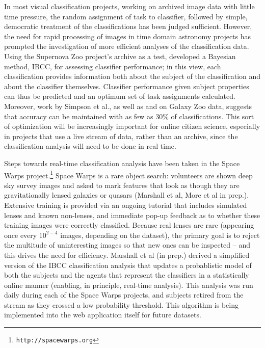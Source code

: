 \documentclass{ar2e}
\def\CaseStudy#1{\noindent{\it\bf #1 \,\,\,\,}}
\def\url#1{\texttt{#1}}
\begin{document}
In most visual classification projects, working on archived image data with
little time pressure, the random assignment of task to classifier, followed by
simple, democratic treatment of the classifications has been judged sufficient.
However, the need for rapid processing of images in time domain astronomy
projects has prompted the investigation of more efficient analyses of the
classification data.  Using the Supernova Zoo project's archive as a test,
\citet{Simpson++2012IBCC} developed a Bayesian method, IBCC, for assessing
classifier performance; in this view, each classification provides information
both about the subject of the classification and about the classifier
themselves. Classifier performance given subject properties can thus be
predicted and an optimum set of task assignments calculated. 
Moreover, work by Simpson et al., as well as \citet{Kamar} and \citet{Waterhouse} on
Galaxy Zoo data, suggests that accuracy can be maintained with as few as 30\% of
classifications. 
This sort of optimization will be increasingly important for online citizen
science, especially in projects that use a live stream of data, rather than
an archive, since the classification analysis will need to be done in real time.


\CaseStudy{Rare event detection: Space Warps} 
Steps towards real-time classification analysis have been taken in the Space
Warps project.\footnote{\url{http://spacewarps.org}} 
Space Warps is a rare object search: volunteers are shown deep
sky survey images and asked to mark features that look as though they are
gravitationally lensed galaxies or quasars (Marshall et al, More et al in prep.).
Extensive training is
provided via an ongoing tutorial that includes simulated lenses and known
non-lenses, and immediate pop-up feedback as to whether these training images
were correctly classified. Because real lenses are rare (appearing once every
$10^{2-4}$ images, depending on the dataset), the primary goal is to reject the
multitude of uninteresting images so that new ones can be inspected -- and this
drives the need for efficiency. Marshall et al (in prep.) derived a
simplified version of the IBCC classification analysis that updates a
probablistic model of both the subjects and the agents that represent the
classifiers in a statistically online manner (enabling, in principle, real-time
analysis). This
analysis was run daily during each of the Space Warps projects, and subjects
retired from the stream as they crossed a low probability threshold. This
algorithm is being implemented into the web application itself for future
datasets. 
\end{document}
